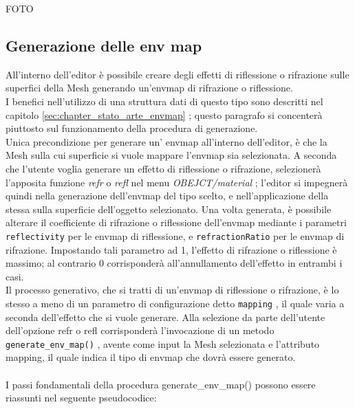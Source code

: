 FOTO 

\subsection{Generazione delle env map}
\label{sec:chapter_creazione_scena_funzionalita_editor_envmap}

All’interno dell’editor è possibile creare degli effetti di riflessione o rifrazione sulle superfici della Mesh generando un’envmap di rifrazione o riflessione.
\\
I benefici nell’utilizzo di una struttura dati di questo tipo sono descritti nel capitolo \ref{sec:chapter_stato_arte_envmap} ; questo paragrafo si concenterà piuttosto sul funzionamento della procedura di generazione. 
\\
Unica precondizione per generare un’ envmap all’interno dell’editor, è che la Mesh sulla cui superficie si vuole mappare l’envmap sia selezionata. A seconda che l’utente voglia generare un effetto di riflessione o rifrazione, selezionerà l’apposita funzione \emph{refr} o \emph{refl} nel menu \emph{OBEJCT/material} ; l’editor si impegnerà quindi nella generazione dell’envmap del tipo scelto, e nell’applicazione della stessa sulla superficie dell’oggetto selezionato. Una volta generata, è possibile alterare il coefficiente di rifrazione o riflessione dell’envmap mediante i parametri \texttt{reflectivity} per le envmap di riflessione, e \texttt{refractionRatio} per le envmap di rifrazione. Impostando tali parametro ad 1, l’effetto di rifrazione o riflessione è massimo; al contrario 0 corrisponderà all’annullamento dell’effetto in entrambi i casi.
\\
Il processo generativo, che si tratti di un’envmap di riflessione o rifrazione, è lo stesso a meno di un parametro di configurazione detto \texttt{mapping} , il quale varia a seconda dell’effetto che si vuole generare. Alla selezione da parte dell’utente dell'opzione refr o refl corrisponderà l’invocazione di un metodo \texttt{generate\_env\_map()} , avente come input la Mesh selezionata e l’attributo mapping, il quale indica il tipo di envmap che dovrà essere generato.
\\
\\
I passi fondamentali della procedura generate\_env\_map() possono essere riassunti nel seguente pseudocodice:
\\
